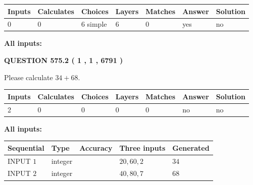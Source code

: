 \documentclass[12pt]{article}
\begin{document}
 
   
   
   
   
\noindent\begin{tabular}{|l|l|l|l|l|l|l|}
 \hline
Inputs & Calculates & Choices & Layers & Matches & Answer & Solution \\ \hline
 0  & 
 0  & 
 6
  simple  
  & 
 6  & 
 0  & 
  yes & 
  no 
  \\ \hline
 \end{tabular}
   
   
   
   
\noindent{}
   
   
   
   
\noindent\vspace{0.1in}\hspace{-0.08in} {\textbf{\Large{All inputs: }}}
   
   
  
\vspace{0.2in}
  
{\textbf{\Large{QUESTION
575.2 
 ( 1 , 1 , 6791 )
}}}
  
  
 
Please calculate $ %
34 +  %
68 $.
 
 
   
   
   
   
\noindent\begin{tabular}{|l|l|l|l|l|l|l|}
 \hline
Inputs & Calculates & Choices & Layers & Matches & Answer & Solution \\ \hline
 2  & 
 0  & 
 0
  & 
 0  & 
 0  & 
  no & 
  no 
  \\ \hline
 \end{tabular}
   
   
   
   
\noindent{}
   
   
   
   
\noindent\vspace{0.1in}\hspace{-0.08in} {\textbf{\Large{All inputs: }}}
   
   
  
  
\noindent\begin{tabular}{|l|l|l|l|l|}
\hline
 Sequential & Type & Accuracy & Three inputs & Generated \\ 
\hline
 
 
  INPUT $  1 $ & integer &  & $
 20
 , 
 60
 , 
 2
 $ & $ 34 $ 
 \\  \hline  
 
 
  INPUT $  2 $ & integer &  & $
 40
 , 
 80
 , 
 7
 $ & $ 68 $ 
 \\  \hline  
 \end{tabular}
   
\end{document}
